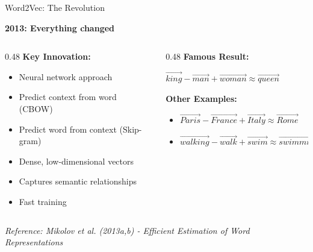 \documentclass[aspectratio=169]{beamer}
\begin{document}
\begin{frame}[shrink=10]{Word2Vec: The Revolution 🚀}
\begin{center}
\LARGE
\textbf{2013: Everything changed}
\end{center}

\vspace{1em}

\begin{columns}[T]
\begin{column}{0.48\textwidth}
\textbf{Key Innovation:}
\begin{itemize}\setlength{\itemsep}{0pt}
    \item Neural network approach
    \item Predict context from word (CBOW)
    \item Predict word from context (Skip-gram)
    \item Dense, low-dimensional vectors
    \item Captures semantic relationships
    \item Fast training
\end{itemize}
\end{column}

\begin{column}{0.48\textwidth}
\textbf{Famous Result:}
\begin{center}
\Large
$\vec{king} - \vec{man} + \vec{woman} \approx \vec{queen}$
\end{center}

\vspace{1em}
\textbf{Other Examples:}
\begin{itemize}\setlength{\itemsep}{0pt}
    \item $\vec{Paris} - \vec{France} + \vec{Italy} \approx \vec{Rome}$
    \item $\vec{walking} - \vec{walk} + \vec{swim} \approx \vec{swimming}$
\end{itemize}
\end{column}
\end{columns}

\vspace{1em}
\small
\textit{Reference: Mikolov et al. (2013a,b) - Efficient Estimation of Word Representations}
\end{frame}
\end{document}

